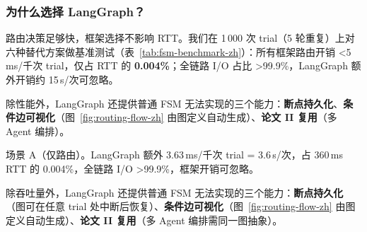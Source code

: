 \subsubsection{为什么选择 LangGraph？}
路由决策足够快，框架选择不影响 RTT。我们在 1\,000 次 trial（5 轮重复）上对六种替代方案做基准测试（表~\ref{tab:fsm-benchmark-zh}）：所有框架路由开销 <5\,ms/千次 trial，仅占 RTT 的 \textbf{0.004\%}；全链路 I/O 占比 >99.9\%，LangGraph 额外开销约 15\,\textmu s/次可忽略。

除性能外，LangGraph 还提供普通 FSM 无法实现的三个能力：\textbf{断点持久化}、\textbf{条件边可视化}（图~\ref{fig:routing-flow-zh} 由图定义自动生成）、\textbf{论文 II 复用}（多 Agent 编排）。

\begin{table}[t]
\centering
\caption{路由框架基准测试（1\,000 次 trial $\times$ 5 轮）。}
\label{tab:fsm-benchmark-zh}
\small
{}
\vskip 2mm
\scriptsize
场景 A（仅路由）。LangGraph 额外 3.63\,ms/千次 trial = 3.6\,\textmu s/次，占 360\,ms RTT 的 0.004\%，全链路 I/O >99.9\%，框架开销可忽略。
\end{table}

除吞吐量外，LangGraph 还提供普通 FSM 无法实现的三个能力：\textbf{断点持久化}（图可在任意 trial 处中断后恢复）、\textbf{条件边可视化}（图~\ref{fig:routing-flow-zh} 由图定义自动生成）、\textbf{论文 II 复用}（多 Agent 编排需同一图抽象）。

